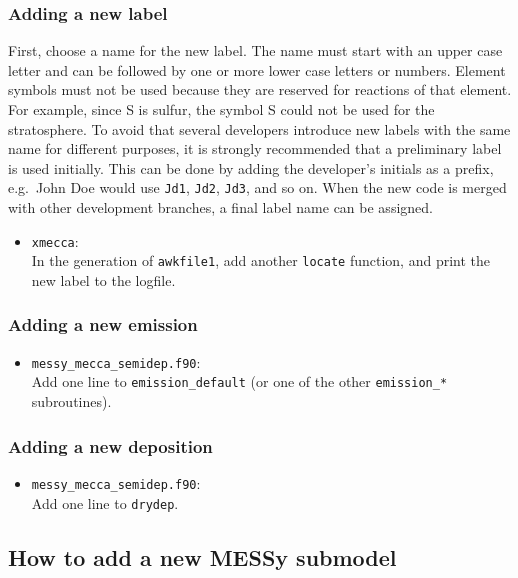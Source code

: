 \documentclass[twoside]{article}
\def\nosep{\setlength\parsep{0mm}\setlength\topsep{0mm}\setlength\itemsep{0mm}}
\begin{document}
\subsubsection{Adding a new label}
\label{sec:newlabel}

First, choose a name for the new label. The name must start with an
upper case letter and can be followed by one or more lower case letters
or numbers. Element symbols must not be used because they are reserved
for reactions of that element. For example, since S is sulfur, the
symbol S could not be used for the stratosphere. To avoid that several
developers introduce new labels with the same name for different
purposes, it is strongly recommended that a preliminary label is used
initially. This can be done by adding the developer's initials as a
prefix, e.g.\ John Doe would use \verb|Jd1|, \verb|Jd2|, \verb|Jd3|, and
so on. When the new code is merged with other development branches, a
final label name can be assigned.

\begin{itemize}\nosep
\item \verb|xmecca|:\\
  In the generation of \verb|awkfile1|, add another \verb|locate|
  function, and print the new label to the logfile.
\end{itemize}

\subsubsection{Adding a new emission}

\begin{itemize}\nosep
\item \verb|messy_mecca_semidep.f90|:\\
  Add one line to \verb|emission_default| (or one of the other
  \verb|emission_*| subroutines).
\end{itemize}

\subsubsection{Adding a new deposition}

\begin{itemize}\nosep
\item \verb|messy_mecca_semidep.f90|:\\
  Add one line to \verb|drydep|.
\end{itemize}

\subsection{How to add a new MESSy submodel}
\end{document}
